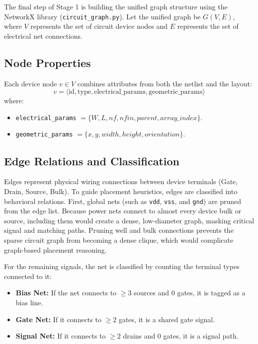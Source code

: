 The final step of Stage 1 is building the unified graph structure using the NetworkX library (\texttt{circuit\_graph.py}). Let the unified graph be $G(V, E)$, where $V$ represents the set of circuit device nodes and $E$ represents the set of electrical net connections.

\subsection{Node Properties}
Each device node $v \in V$ combines attributes from both the netlist and the layout:
\begin{equation}
    v = \langle \text{id}, \text{type}, \text{electrical\_params}, \text{geometric\_params} \rangle
\end{equation}
where:
\begin{itemize}
    \item \texttt{electrical\_params} $= \{W, L, nf, nfin, parent, array\_index\}$.
    \item \texttt{geometric\_params} $= \{x, y, width, height, orientation\}$.
\end{itemize}

\subsection{Edge Relations and Classification}
Edges represent physical wiring connections between device terminals (Gate, Drain, Source, Bulk). To guide placement heuristics, edges are classified into behavioral relations. First, global nets (such as \texttt{vdd}, \texttt{vss}, and \texttt{gnd}) are pruned from the edge list. Because power nets connect to almost every device bulk or source, including them would create a dense, low-diameter graph, masking critical signal and matching paths. Pruning well and bulk connections prevents the sparse circuit graph from becoming a dense clique, which would complicate graph-based placement reasoning.

For the remaining signals, the net is classified by counting the terminal types connected to it:
\begin{itemize}
    \item \textbf{Bias Net:} If the net connects to $\ge 3$ sources and 0 gates, it is tagged as a bias line.
    \item \textbf{Gate Net:} If it connects to $\ge 2$ gates, it is a shared gate signal.
    \item \textbf{Signal Net:} If it connects to $\ge 2$ drains and 0 gates, it is a signal path.
\end{itemize}

